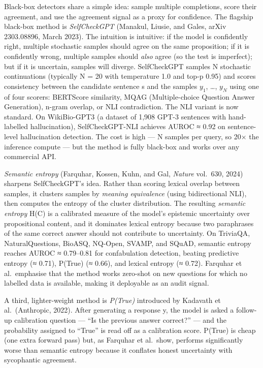 Black-box detectors share a simple idea: sample multiple completions, score their agreement, and use the agreement signal as a proxy for confidence. The flagship black-box method is \emph{SelfCheckGPT} (Manakul, Liusie, and Gales, arXiv 2303.08896, March 2023). The intuition is intuitive: if the model is confidently right, multiple stochastic samples should agree on the same proposition; if it is confidently wrong, multiple samples should \emph{also} agree (so the test is imperfect); but if it is uncertain, samples will diverge. SelfCheckGPT samples N stochastic continuations (typically N = 20 with temperature 1.0 and top-p 0.95) and scores consistency between the candidate sentence s and the samples \(y_1\), \ldots, \(y_N\) using one of four scorers: BERTScore similarity, MQAG (Multiple-choice Question Answer Generation), n-gram overlap, or NLI contradiction. The NLI variant is now standard. On WikiBio-GPT3 (a dataset of 1,908 GPT-3 sentences with hand-labelled hallucination), SelfCheckGPT-NLI achieves AUROC ≈ 0.92 on sentence-level hallucination detection. The cost is high --- N samples per query, so 20× the inference compute --- but the method is fully black-box and works over any commercial API.

\emph{Semantic entropy} (Farquhar, Kossen, Kuhn, and Gal, \emph{Nature} vol.~630, 2024) sharpens SelfCheckGPT's idea. Rather than scoring lexical overlap between samples, it clusters samples by \emph{meaning equivalence} (using bidirectional NLI), then computes the entropy of the cluster distribution. The resulting \emph{semantic entropy} H(C) is a calibrated measure of the model's epistemic uncertainty over propositional content, and it dominates lexical entropy because two paraphrases of the same correct answer should not contribute to uncertainty. On TriviaQA, NaturalQuestions, BioASQ, NQ-Open, SVAMP, and SQuAD, semantic entropy reaches AUROC ≈ 0.79--0.81 for confabulation detection, beating predictive entropy (≈ 0.71), P(True) (≈ 0.66), and lexical entropy (≈ 0.72). Farquhar et al.~emphasise that the method works zero-shot on new questions for which no labelled data is available, making it deployable as an audit signal.

A third, lighter-weight method is \emph{P(True)} introduced by Kadavath et al.~(Anthropic, 2022). After generating a response y, the model is asked a follow-up calibration question --- ``Is the previous answer correct?'' --- and the probability assigned to ``True'' is read off as a calibration score. P(True) is cheap (one extra forward pass) but, as Farquhar et al.~show, performs significantly worse than semantic entropy because it conflates honest uncertainty with sycophantic agreement.

